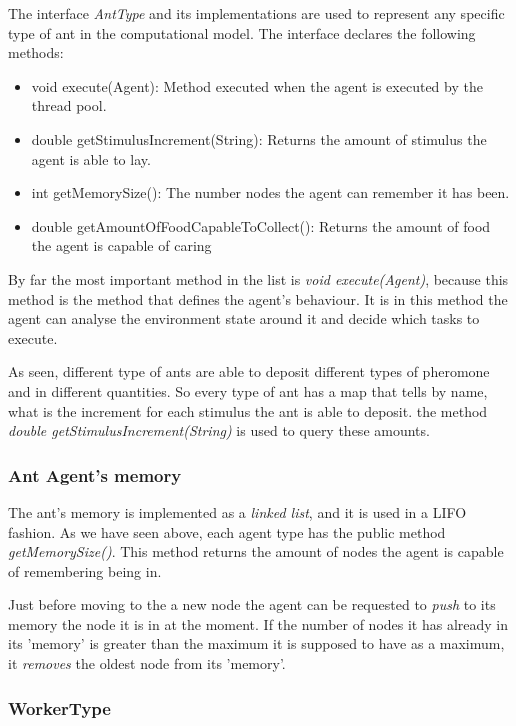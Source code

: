 The interface \emph{AntType} and its implementations are used to represent any specific type of ant in the computational model. The interface declares the following methods:

\begin{itemize}

  \item void execute(Agent): Method executed when the agent is executed by the thread pool.
  \item double getStimulusIncrement(String): Returns the amount of stimulus the agent is able to lay.
  \item int getMemorySize(): The number nodes the agent can remember it has been.
  \item double getAmountOfFoodCapableToCollect(): Returns the amount of food the agent is capable of caring 

\end{itemize}


By far the most important method in the list is \emph{void execute(Agent)}, because this method is the method that defines the agent's behaviour. It is in this method the agent can analyse the environment state around it and decide which tasks to execute.

As seen, different type of ants are able to deposit different types of pheromone and in different quantities. So every type of ant has a map that tells by name, what is the increment for each stimulus the ant is able to deposit. the method \emph{double getStimulusIncrement(String)} is used to query these amounts.

\subsubsection{Ant Agent's memory}
\label{sec:ant-memory}

The ant's memory is implemented as a \emph{linked list}, and it is used in a \ac{LIFO} fashion. As we have seen above, each agent type has the public method \emph{getMemorySize()}. This method returns the amount of nodes the agent is capable of remembering being in.

Just before moving to the a new node the agent can be requested to \emph{push} to its memory the node it is in at the moment. If the number of nodes it has already in its 'memory' is greater than the maximum it is supposed to have as a maximum, it \emph{removes} the oldest node from its 'memory'.

\subsubsection{WorkerType}

